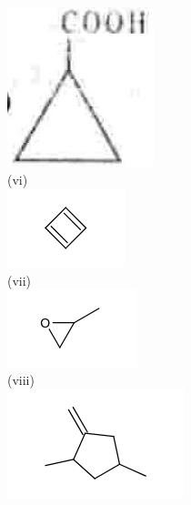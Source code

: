 \documentclass[10pt]{article}
\begin{document}
\includegraphics[max width=\textwidth, center]{2025_01_28_8470952b98110cec3aabg-114}\\
(vi)\\
\includegraphics{smile-503b90574bc903ab771fb2ba3184926345a6e115}\\
(vii)\\
\includegraphics{smile-5276484589a563ed29477f9ffa7b2ee2c084e8f7}\\
(viii)\\
\includegraphics{smile-407276f4da8a5e632fdb7117aa6b0069001e35a1}\\
\end{document}
